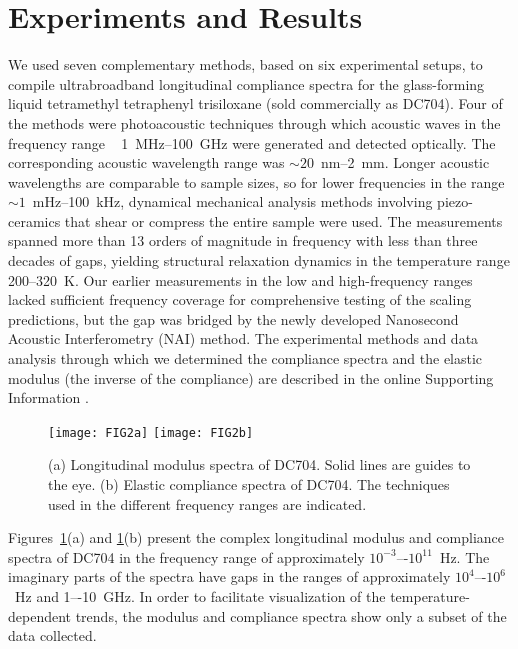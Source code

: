 \documentclass[reprint,showpacs,amsmath,amssymb,aip,jcp]{revtex4-1}
\begin{document}
\section{Experiments and Results}

We used seven complementary methods, based on six experimental setups,
to compile ultrabroadband longitudinal compliance spectra for the
glass-forming liquid tetramethyl tetraphenyl trisiloxane (sold
commercially as DC704). Four of the methods were photoacoustic
techniques \cite{Yan1987a, Silence1992, Thomsen1986, Choi2005,
  Supplementary} through which acoustic waves in the frequency range ~
1~MHz--100~GHz were generated and detected optically. The
corresponding acoustic wavelength range was $\sim 20$~nm--2~mm. Longer
acoustic wavelengths are comparable to sample sizes, so for lower
frequencies in the range $\sim1$~mHz--100~kHz, dynamical mechanical
analysis methods involving piezo-ceramics that shear or compress the
entire sample \cite{Hecksher2013, Christensen1994b, Christensen1995}
were used. The measurements spanned more than 13 orders of magnitude
in frequency with less than three decades of gaps, yielding structural
relaxation dynamics in the temperature range 200--320~K. Our earlier
measurements in the low and high-frequency ranges \cite{Hecksher2013,
  Klieber2013} lacked sufficient frequency coverage for comprehensive
testing of the scaling predictions, but the gap was bridged by the
newly developed Nanosecond Acoustic Interferometry (NAI) method. The
experimental methods and data analysis through which we determined the
compliance spectra and the elastic modulus (the inverse of the
compliance) are described in the online Supporting Information
\cite{Supplementary}.

\begin{figure}
  \begin{center}
    \texttt{[image: FIG2a]}
    \texttt{[image: FIG2b]}
  \end{center}
  \caption{\label{fig:modcom} (a) Longitudinal modulus spectra of
    DC704. Solid lines are guides to the eye. (b) Elastic compliance
    spectra of DC704. The techniques used in the different frequency
    ranges are indicated.}
\end{figure}

Figures~\ref{fig:modcom}(a) and \ref{fig:modcom}(b) present the
complex longitudinal modulus and compliance spectra of DC704 in the
frequency range of approximately $10^{-3}$–-$10^{11}$~Hz. The
imaginary parts of the spectra have gaps in the ranges of
approximately $10^4$–-$10^6$~Hz and 1–-10~GHz. In order to facilitate
visualization of the temperature-dependent trends, the modulus and
compliance spectra show only a subset of the data collected.
\end{document}
